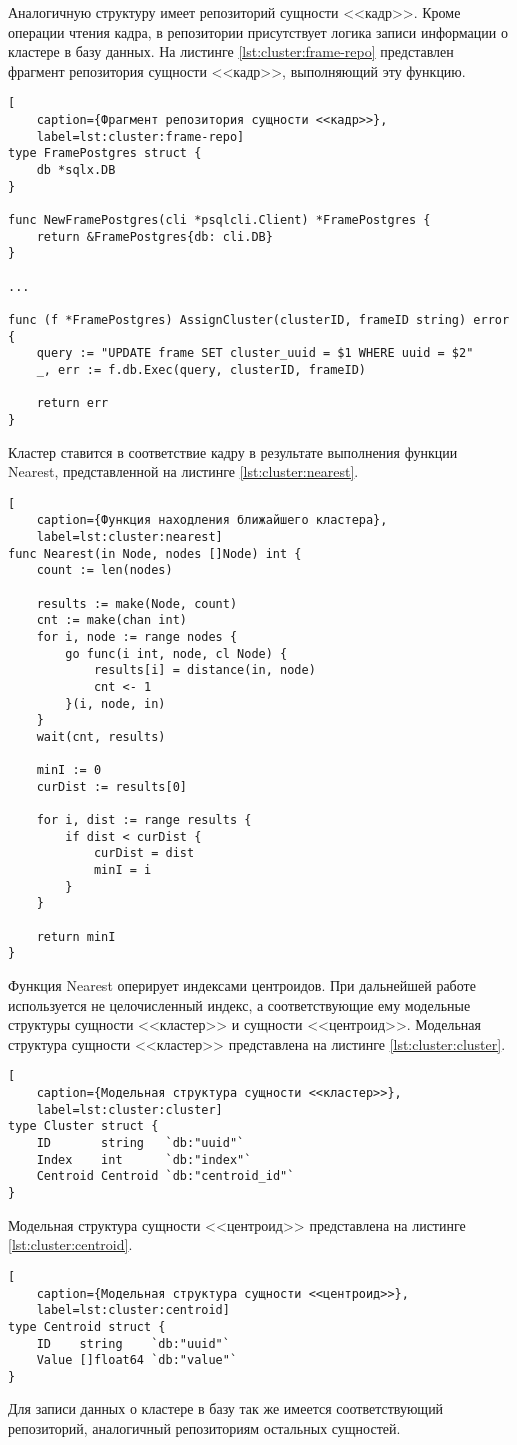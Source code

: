 Аналогичную структуру имеет репозиторий сущности <<кадр>>. Кроме операции чтения кадра, в репозитории присутствует логика записи информации о кластере в базу данных. На листинге \ref{lst:cluster:frame-repo} представлен фрагмент репозитория сущности <<кадр>>, выполняющий эту функцию.
\begin{lstlisting}[
	caption={Фрагмент репозитория сущности <<кадр>>},
	label=lst:cluster:frame-repo]
type FramePostgres struct {
	db *sqlx.DB
}

func NewFramePostgres(cli *psqlcli.Client) *FramePostgres {
	return &FramePostgres{db: cli.DB}
}

...

func (f *FramePostgres) AssignCluster(clusterID, frameID string) error {
	query := "UPDATE frame SET cluster_uuid = $1 WHERE uuid = $2"
	_, err := f.db.Exec(query, clusterID, frameID)
	
	return err
}
\end{lstlisting}
Кластер ставится в соответствие кадру в результате выполнения функции Nearest, представленной на листинге \ref{lst:cluster:nearest}.
\begin{lstlisting}[
	caption={Функция находления ближайшего кластера},
	label=lst:cluster:nearest]
func Nearest(in Node, nodes []Node) int {
	count := len(nodes)
	
	results := make(Node, count)
	cnt := make(chan int)
	for i, node := range nodes {
		go func(i int, node, cl Node) {
			results[i] = distance(in, node)
			cnt <- 1
		}(i, node, in)
	}
	wait(cnt, results)
	
	minI := 0
	curDist := results[0]
	
	for i, dist := range results {
		if dist < curDist {
			curDist = dist
			minI = i
		}
	}
	
	return minI
}
\end{lstlisting}
Функция Nearest оперирует индексами центроидов. При дальнейшей работе используется не целочисленный индекс, а соответствующие ему модельные структуры сущности <<кластер>> и сущности <<центроид>>. Модельная структура сущности <<кластер>> представлена на листинге \ref{lst:cluster:cluster}.
\begin{lstlisting}[
	caption={Модельная структура сущности <<кластер>>},
	label=lst:cluster:cluster]
type Cluster struct {
    ID       string   `db:"uuid"`
    Index    int      `db:"index"`
    Centroid Centroid `db:"centroid_id"`
}
\end{lstlisting}
Модельная структура сущности <<центроид>> представлена на листинге \ref{lst:cluster:centroid}.
\begin{lstlisting}[
	caption={Модельная структура сущности <<центроид>>},
	label=lst:cluster:centroid]
type Centroid struct {
	ID    string    `db:"uuid"`
	Value []float64 `db:"value"`
}
\end{lstlisting}
Для записи данных о кластере в базу так же имеется соответствующий репозиторий, аналогичный репозиториям остальных сущностей. 

